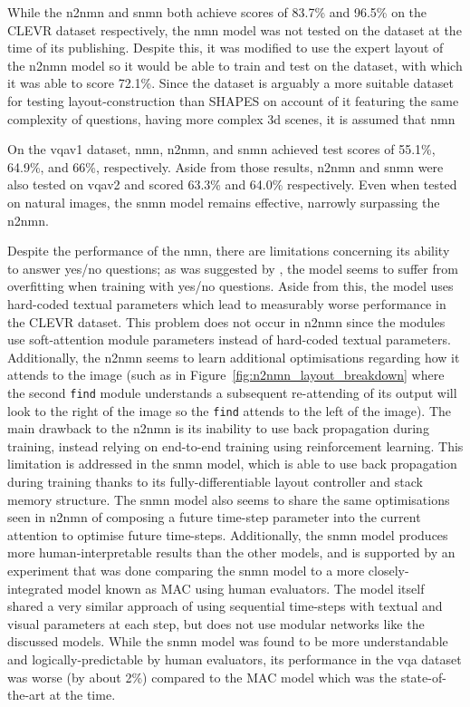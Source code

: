 While the \gls{n2nmn} and \gls{snmn} both achieve scores of 83.7\% and 96.5\% on the CLEVR dataset respectively, the \gls{nmn} model was not tested on the dataset at the time of its publishing.
Despite this, it was modified to use the expert layout of the \gls{n2nmn} model so it would be able to train and test on the dataset, with which it was able to score 72.1\%\cite{hu_learning_2017}.
Since the dataset is arguably a more suitable dataset for testing layout-construction than SHAPES on account of it featuring the same complexity of questions, having more complex 3d scenes, it is assumed that \gls{nmn}

On the \gls{vqa}v1 dataset, \gls{nmn}, \gls{n2nmn}, and \gls{snmn} achieved test scores of 55.1\%, 64.9\%, and 66\%, respectively. Aside from those results, \gls{n2nmn} and \gls{snmn} were also tested on \gls{vqa}v2 and scored 63.3\% and 64.0\% respectively. Even when tested on natural images, the \gls{snmn} model remains effective, narrowly surpassing the \gls{n2nmn}.

Despite the performance of the \gls{nmn}, there are limitations concerning its ability to answer yes/no questions; as was suggested by \citeauthor{andreas_deep_2016}\cite{andreas_deep_2016}, the model seems to suffer from overfitting when training with yes/no questions.
Aside from this, the model uses hard-coded textual parameters which lead to measurably worse performance in the CLEVR dataset.
This problem does not occur in \gls{n2nmn} since the modules use soft-attention module parameters instead of hard-coded textual parameters.
Additionally, the \gls{n2nmn} seems to learn additional optimisations regarding how it attends to the image (such as in Figure~\ref{fig:n2nmn_layout_breakdown} where the second \texttt{find} module understands a subsequent re-attending of its output will look to the right of the image so the \texttt{find} attends to the left of the image).
The main drawback to the \gls{n2nmn} is its inability to use back propagation during training, instead relying on end-to-end training using reinforcement learning.
This limitation is addressed in the \gls{snmn} model, which is able to use back propagation during training thanks to its fully-differentiable layout controller and stack memory structure.
The \gls{snmn} model also seems to share the same optimisations seen in \gls{n2nmn} of composing a future time-step parameter into the current attention to optimise future time-steps.
Additionally, the \gls{snmn} model produces more human-interpretable results than the other models, and is supported by an experiment that was done comparing the \gls{snmn} model to a more closely-integrated model known as MAC\cite{hudson_compositional_2018} using human evaluators.
The model itself shared a very similar approach of using sequential time-steps with textual and visual parameters at each step, but does not use modular networks like the discussed models.
While the \gls{snmn} model was found to be more understandable and logically-predictable by human evaluators, its performance in the \gls{vqa} dataset was worse (by about 2\%) compared to the MAC model which was the state-of-the-art at the time\cite{hu_explainable_2019}.


